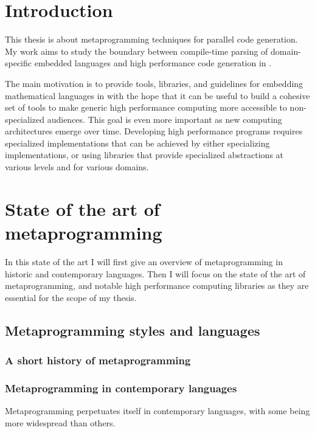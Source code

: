 \documentclass[../../main.tex]{subfiles}
\begin{document}

\chapter{Introduction}

This thesis is about metaprogramming techniques for parallel code generation.
My work aims to study the boundary between compile-time parsing of
domain-specific embedded languages and high performance code generation in \cpp.

The main motivation is to provide tools, libraries, and guidelines for embedding
mathematical languages in \cpp with the hope that it can be useful to build a
cohesive set of tools to make generic high performance computing more accessible
to non-specialized audiences. This goal is even more important as new computing
architectures emerge over time. Developing high performance programs requires
specialized implementations that can be achieved by either specializing
implementations, or using libraries that provide specialized abstractions at
various levels and for various domains.

\chapter{State of the art of metaprogramming}

In this state of the art I will first give an overview of metaprogramming in
historic and contemporary languages. Then I will focus on the state of the art
of \cpp metaprogramming, and notable high performance computing libraries as they
are essential for the scope of my thesis.

\section{Metaprogramming styles and languages}

\subsection{A short history of metaprogramming}

\subsection{Metaprogramming in contemporary languages}

Metaprogramming perpetuates itself in contemporary languages,
with some being more widespread than others.
\end{document}
